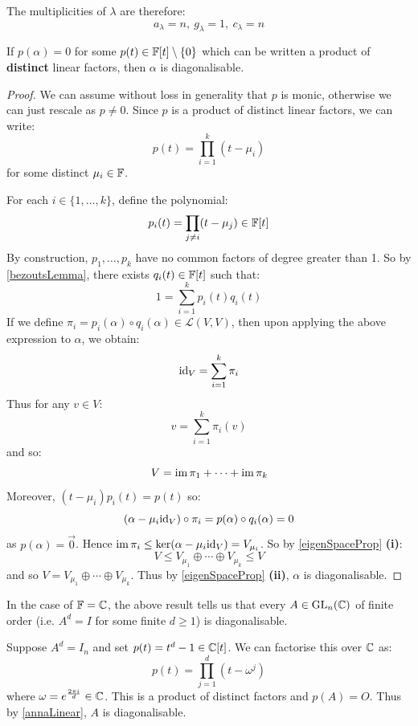 \documentclass[../main.tex]{subfiles}
\begin{document}
\begin{example}
\begin{enumerate}
      The multiplicities of $\lambda$ are therefore:
      \[
        a_{\lambda} = n,\ g_{\lambda} = 1,\ c_{\lambda} = n
      \]
  \end{enumerate}
\end{example}
\begin{theorem}
  If $p(\alpha) = 0$ for some $p(t) \in \mathbb{F}[t] \setminus \{0\}$ which can be written a product of \textbf{distinct} linear factors, then $\alpha$ is diagonalisable. \label{annaLinear}
\end{theorem}
\begin{proof}
  We can assume without loss in generality that $p$ is monic, otherwise we can just rescale as $p \neq 0$.
  Since $p$ is a product of distinct linear factors, we can write:
  \[
    p(t) = \prod_{i = 1}^{k} (t - \mu_i)
  \]
  for some distinct $\mu_i \in \mathbb{F}$.

  For each $i \in \{1, \ldots, k\}$, define the polynomial:
  \[
    p_i(t) = \prod_{j \neq i} (t - \mu_j) \in \mathbb{F}[t]
  \]
  By construction, $p_1, \ldots, p_k$ have no common factors of degree greater than 1.
  So by \cref{bezoutsLemma}, there exists $q_i(t) \in \mathbb{F}[t]$ such that:
  \[
    1 = \sum_{i = 1}^{k} p_i(t) q_i(t)
  \]
  If we define $\pi_i = p_i(\alpha) \circ q_i(\alpha) \in \mathcal{L}(V, V)$, then upon applying the above expression to $\alpha$, we obtain:
  \[
    \mathrm{id}_V = \sum_{i = 1}^{k} \pi_i
  \]
  Thus for any $v \in V$:
  \[
    v = \sum_{i = 1}^{k} \pi_i(v)
  \]
  and so:
  \[
    V = \operatorname{im} \pi_1 + \cdots + \operatorname{im} \pi_k
  \]
  Moreover, $(t - \mu_i)p_i(t) = p(t)$ so:
  \[
    (\alpha - \mu_i \mathrm{id}_V) \circ \pi_i = p(\alpha) \circ q_i(\alpha) = 0
  \]
  as $p(\alpha) = \vec{0}$.
  Hence $\operatorname{im} \pi_i \leq \ker(\alpha - \mu_i \mathrm{id}_V) = V_{\mu_i}$.
  So by \cref{eigenSpaceProp} \textbf{(i)}:
  \[
    V \leq V_{\mu_1} \oplus \cdots \oplus V_{\mu_k} \leq V
  \]
  and so $V = V_{\mu_1} \oplus \cdots \oplus V_{\mu_k}$.
  Thus by \cref{eigenSpaceProp} \textbf{(ii)}, $\alpha$ is diagonalisable.
\end{proof}
\begin{example}
  In the case of $\mathbb{F} = \mathbb{C}$, the above result tells us that every $A \in \mathrm{GL}_n(\mathbb{C})$ of finite order (i.e. $A^d = I$ for some finite $d \geq 1$) is diagonalisable.

  Suppose $A^{d} = I_n$ and set $p(t) = t^d - 1 \in \mathbb{C}[t]$.
  We can factorise this over $\mathbb{C}$ as:
  \[
    p(t) = \prod_{j = 1}^{d} (t - \omega^{j})
  \]
  where $\omega = e^{\frac{2\pi i}{d}} \in \mathbb{C}$.
  This is a product of distinct factors and $p(A) = O$.
  Thus by \cref{annaLinear}, $A$ is diagonalisable.
\end{example}
\end{document}
